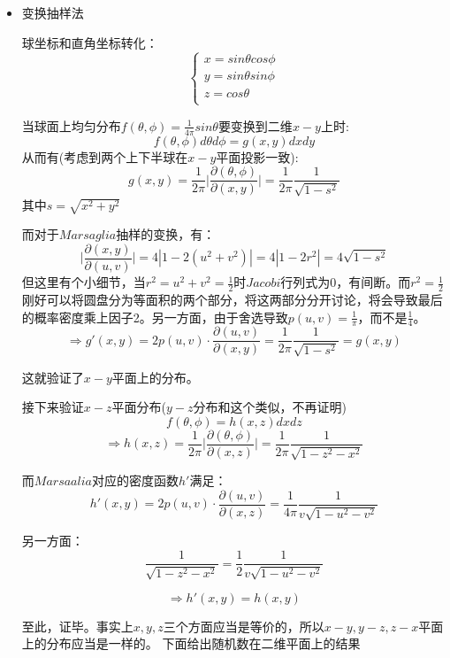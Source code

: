 \documentclass[UTF8]{ctexart}
\begin{document}
	\begin{itemize}
		\item 变换抽样法
		
		球坐标和直角坐标转化：
		$$ \left\{
		\begin{array}{l}
		x=sin\theta cos\phi\\
		y=sin\theta sin\phi\\
		z=cos\theta\\
		\end{array} \right. $$
		
		当球面上均匀分布$f(\theta,\phi)=\frac{1}{4\pi}sin\theta$要变换到二维$x-y$上时:
		$$f(\theta,\phi)d\theta d\phi=g(x,y)dxdy$$
		从而有(考虑到两个上下半球在$x-y$平面投影一致):
		$$g(x,y)=\frac{1}{2\pi}\vert \frac{\partial(\theta,\phi)}{\partial(x,y)}\vert=\frac{1}{2\pi}\frac{1}{\sqrt{1-s^2}}$$
		其中$s=\sqrt{x^2+y^2}$
		
		而对于$Marsaglia$抽样的变换，有：
		$$\vert \frac{\partial(x,y)}{\partial(u,v)}\vert=4|1-2(u^2+v^2)|=4|1-2r^2|=4\sqrt{1-s^2}$$
		但这里有个小细节，当$r^2=u^2+v^2=\frac{1}{2}$时$Jacobi$行列式为0，有间断。而$r^2=\frac{1}{2}$刚好可以将圆盘分为等面积的两个部分，将这两部分分开讨论，将会导致最后的概率密度乘上因子2。另一方面，由于舍选导致$p(u,v)=\frac{1}{\pi}$，而不是$\frac{1}{4}$。
		$$\Rightarrow g'(x,y)=2p(u,v)\cdot\frac{\partial(u,v)}{\partial(x,y)}=\frac{1}{2\pi}\frac{1}{\sqrt{1-s^2}}=g(x,y)$$
		
		这就验证了$x-y$平面上的分布。
		
		接下来验证$x-z$平面分布($y-z$分布和这个类似，不再证明)
		$$f(\theta,\phi)=h(x,z)dxdz$$
		$$\Rightarrow h(x,z)=\frac{1}{2\pi}\vert \frac{\partial(\theta,\phi)}{\partial(x,z)}\vert=\frac{1}{2\pi}\frac{1}{\sqrt{1-z^2-x^2}}$$
		
		而$Marsaalia$对应的密度函数$h'$满足：
		$$h'(x,y)=2p(u,v)\cdot\frac{\partial(u,v)}{\partial(x,z)}=\frac{1}{4\pi}\frac{1}{v\sqrt{1-u^2-v^2}}$$
		
		另一方面：
		$$\frac{1}{\sqrt{1-z^2-x^2}}=\frac{1}{2}\frac{1}{v\sqrt{1-u^2-v^2}}$$
		
		$$\Rightarrow h'(x,y)=h(x,y)$$
		
		至此，证毕。事实上$x,y,z$三个方面应当是等价的，所以$x-y,y-z,z-x$平面上的分布应当是一样的。
		下面给出随机数在二维平面上的结果
	\end{itemize}
	
\end{document}
